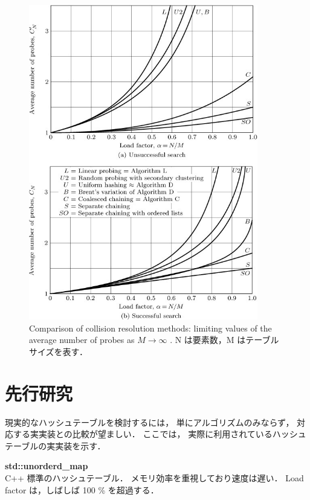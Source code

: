 \begin{figure} %
  \centering
  \includegraphics[width=10cm]{./fig/taocp_v3_fig44.png}
  \caption{
    Comparison of collision resolution methods: limiting values of the average number of probes as $M \rightarrow \infty$ \citep{knuth1998}.
    N は要素数，M はテーブルサイズを表す．
  }
  \label{fig_taocp_v3_fig44}
\end{figure}


\section{先行研究}
現実的なハッシュテーブルを検討するには，
単にアルゴリズムのみならず，
対応する実実装との比較が望ましい．
ここでは，
実際に利用されているハッシュテーブルの実実装を示す．
\leavevmode \newline

{\bf std::unorderd\_map}
\samepage \\ \indent
C++ 標準のハッシュテーブル．
メモリ効率を重視しており速度は遅い．
Load factor は，しばしば 100 \% を超過する．

